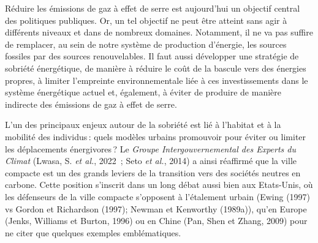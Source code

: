 \documentclass[
  9pt,
  a4paper,
  DIV=11]{scrreprt}
\begin{document}
Réduire les émissions de gaz à effet de serre est aujourd'hui un
objectif central des politiques publiques. Or, un tel objectif ne peut
être atteint sans agir à différents niveaux et dans de nombreux
domaines. Notamment, il ne va pas suffire de remplacer, au sein de notre
système de production d'énergie, les sources fossiles par des sources
renouvelables. Il faut aussi développer une stratégie de sobriété
énergétique, de manière à réduire le coût de la bascule vers des
énergies propres, à limiter l'empreinte environnementale liée à ces
investissements dans le système énergétique actuel et, également, à
éviter de produire de manière indirecte des émissions de gaz à effet de
serre.

L'un des principaux enjeux autour de la sobriété est lié à l'habitat et
à la mobilité des individus\,: quels modèles urbains promouvoir pour
éviter ou limiter les déplacements énergivores\,? Le \emph{Groupe
Intergouvernemental des Experts du Climat} (Lwasa, S. \emph{et al.},
2022~; Seto \emph{et al.}, 2014) a ainsi réaffirmé que la ville compacte
est un des grands leviers de la transition vers des sociétés neutres en
carbone. Cette position s'inscrit dans un long débat aussi bien aux
Etats-Unis, où les défenseurs de la ville compacte s'opposent à
l'étalement urbain (Ewing (1997) vs Gordon et Richardson (1997); Newman
et Kenworthy (1989a)), qu'en Europe (Jenks, Williams et Burton, 1996) ou
en Chine (Pan, Shen et Zhang, 2009) pour ne citer que quelques exemples
emblématiques.
\end{document}
